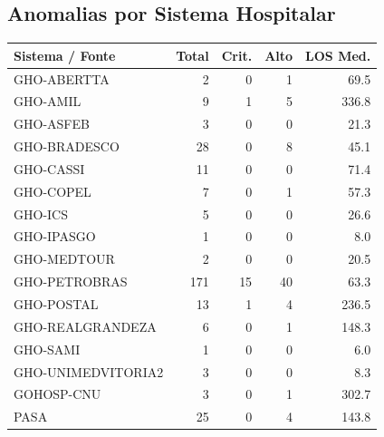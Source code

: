 \documentclass[a4paper,10pt]{article}
\begin{document}
\subsection{Anomalias por Sistema Hospitalar}
\begin{center}
\begin{longtable}{lrrrr}
\toprule
\textbf{Sistema / Fonte} & \textbf{Total} & \textbf{Crit.} & \textbf{Alto} & \textbf{LOS Med.} \\
\midrule
\endhead
\bottomrule
\endfoot

GHO-ABERTTA & 2 & \textcolor{anomred}{0} & \textcolor{anomorange}{1} & 69.5 \\

GHO-AMIL & 9 & \textcolor{anomred}{1} & \textcolor{anomorange}{5} & 336.8 \\

GHO-ASFEB & 3 & \textcolor{anomred}{0} & \textcolor{anomorange}{0} & 21.3 \\

GHO-BRADESCO & 28 & \textcolor{anomred}{0} & \textcolor{anomorange}{8} & 45.1 \\

GHO-CASSI & 11 & \textcolor{anomred}{0} & \textcolor{anomorange}{0} & 71.4 \\

GHO-COPEL & 7 & \textcolor{anomred}{0} & \textcolor{anomorange}{1} & 57.3 \\

GHO-ICS & 5 & \textcolor{anomred}{0} & \textcolor{anomorange}{0} & 26.6 \\

GHO-IPASGO & 1 & \textcolor{anomred}{0} & \textcolor{anomorange}{0} & 8.0 \\

GHO-MEDTOUR & 2 & \textcolor{anomred}{0} & \textcolor{anomorange}{0} & 20.5 \\

GHO-PETROBRAS & 171 & \textcolor{anomred}{15} & \textcolor{anomorange}{40} & 63.3 \\

GHO-POSTAL & 13 & \textcolor{anomred}{1} & \textcolor{anomorange}{4} & 236.5 \\

GHO-REALGRANDEZA & 6 & \textcolor{anomred}{0} & \textcolor{anomorange}{1} & 148.3 \\

GHO-SAMI & 1 & \textcolor{anomred}{0} & \textcolor{anomorange}{0} & 6.0 \\

GHO-UNIMEDVITORIA2 & 3 & \textcolor{anomred}{0} & \textcolor{anomorange}{0} & 8.3 \\

GOHOSP-CNU & 3 & \textcolor{anomred}{0} & \textcolor{anomorange}{1} & 302.7 \\

PASA & 25 & \textcolor{anomred}{0} & \textcolor{anomorange}{4} & 143.8 \\

\end{longtable}\end{center}
\end{document}

